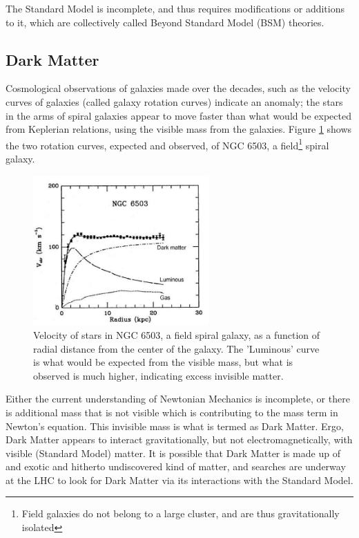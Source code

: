 \documentclass[11pt,a4paper,openright,twoside]{report}
\begin{document}
The Standard Model is incomplete, and thus requires modifications or additions to it, which are collectively called Beyond Standard Model (BSM) theories.
\vfill

\subsection{Dark Matter}
Cosmological observations of galaxies made over the decades, such as the velocity curves of galaxies (called galaxy rotation curves) indicate an anomaly; the stars in the arms of spiral galaxies appear to move faster than what would be expected from Keplerian relations, using the visible mass from the galaxies. Figure \ref{fig:grc} shows the two rotation curves, expected and observed, of NGC 6503, a field\footnote{Field galaxies do not belong to a large cluster, and are thus gravitationally isolated}  spiral galaxy.\cite{galaxy}
\begin{figure}[H]
\centering
	\includegraphics[width=0.6\textwidth]{GRC.jpeg}
	\caption{Velocity of stars in NGC 6503, a field spiral galaxy, as a function of radial distance from the center of the galaxy\cite{galaxy}. The 'Luminous' curve is what would be expected from the visible mass, but what is observed is much higher, indicating excess invisible matter.}
	\label{fig:grc}
\end{figure}
Either the current understanding of Newtonian Mechanics is incomplete, or there is additional mass that is not visible which is contributing to the mass term in Newton's equation. This invisible mass is what is termed as Dark Matter. Ergo, Dark Matter appears to interact gravitationally, but not electromagnetically, with visible (Standard Model) matter. It is possible that Dark Matter is made up of and exotic and hitherto undiscovered kind of matter, and searches are underway at the LHC to look for Dark Matter via its interactions with the Standard Model.
\end{document}
